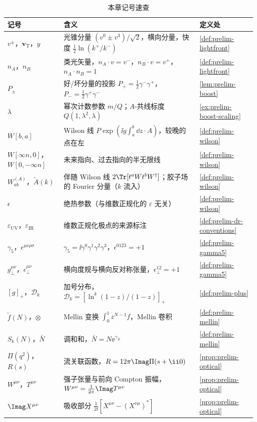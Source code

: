 \begin{table}[htbp]
\centering
\caption{本章记号速查}\label{tab:prelim-symbols}
\footnotesize
\renewcommand{\arraystretch}{1.05}
\begin{tabularx}{\textwidth}{@{}l X l@{}}
\toprule
记号 & 含义 & 定义处 \\
\midrule
$v^\pm$，$\mathbf v_{\mathrm T}$，$y$ & 光锥分量 $(v^0\pm v^3)/\sqrt2$，横向分量，快度 $\frac12\ln(k^+/k^-)$ & \cref{def:prelim-lightfront} \\
$n_A$，$n_B$ & 类光矢量，$n_A\cdot v=v^-$，$n_B\cdot v=v^+$，$n_A\cdot n_B=1$ & \cref{def:prelim-lightfront} \\
$P_\pm$ & 好/坏分量的投影 $P_+=\frac12\gamma^-\gamma^+$，$P_-=\frac12\gamma^+\gamma^-$ & \cref{lem:prelim-boost} \\
$\lambda$ & 幂次计数参数 $m/Q$；$A$-共线标度 $Q(1,\lambda^2,\lambda)$ & \cref{ex:prelim-boost-scaling} \\
$W[b,a]$ & Wilson 线 $P\exp(\ii g\int_a^b\dd z\cdot A)$，较晚的点在左 & \cref{def:prelim-wilson} \\
$W[\infty n,0]$，$W[0,-\infty n]$ & 未来指向、过去指向的半无限线 & \cref{def:prelim-wilson} \\
$W^{(A)}_{ab}$，$\tilde A(k)$ & 伴随 Wilson 线 $2\Tr[t^aWt^bW^\dagger]$；胶子场的 Fourier 分量（$k$ 流入） & \cref{def:prelim-wilson} \\
$\epsilon$ & 绝热参数（与维数正规化的 $\varepsilon$ 无关） & \cref{def:prelim-wilson} \\
$\varepsilon_{\mathrm{UV}}$，$\varepsilon_{\mathrm{IR}}$ & 维数正规化极点的来源标注 & \cref{def:prelim-dr-conventions} \\
$\gamma_5$，$\epsilon^{\mu\nu\rho\sigma}$ & $\gamma_5=\ii\gamma^0\gamma^1\gamma^2\gamma^3$，$\epsilon^{0123}=+1$ & \cref{def:prelim-gamma5} \\
$g_\perp^{\mu\nu}$，$\epsilon_\perp^{\mu\nu}$ & 横向度规与横向反对称张量，$\epsilon_\perp^{12}=+1$ & \cref{def:prelim-gamma5} \\
$[g]_+$，$\mathcal D_k$ & 加号分布，$\mathcal D_k=[\ln^k(1-z)/(1-z)]_+$ & \cref{def:prelim-plus} \\
$\tilde f(N)$，$\otimes$ & Mellin 变换 $\int_0^1z^{N-1}f$，Mellin 卷积 & \cref{def:prelim-mellin} \\
$S_k(N)$，$\bar N$ & 调和和，$\bar N=N\ee^{\gamma_E}$ & \cref{def:prelim-mellin} \\
$\Pi(q^2)$，$R(s)$ & 流关联函数，$R=12\pi\Imag\Pi(s+\ii0)$ & \cref{prop:prelim-optical} \\
$W^{\mu\nu}$，$T^{\mu\nu}$ & 强子张量与前向 Compton 振幅，$W^{\mu\nu}=\frac1{2\pi}\Imag T^{\mu\nu}$ & \cref{prop:prelim-optical} \\
$\Imag X^{\mu\nu}$ & 吸收部分 $\frac1{2\ii}[X^{\mu\nu}-(X^{\nu\mu})^*]$ & \cref{prop:prelim-optical} \\
\bottomrule
\end{tabularx}
\end{table}
